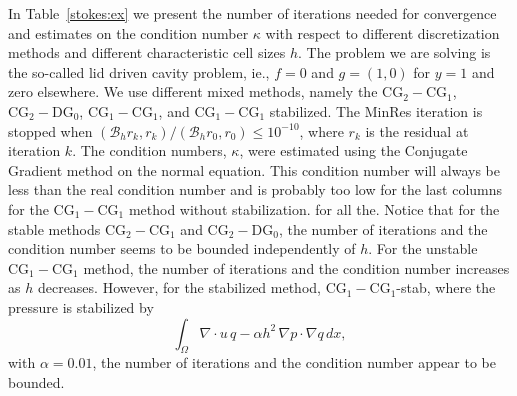 In Table~\ref{stokes:ex} 
we present the number of iterations needed for convergence 
and estimates on the condition number $\kappa$ with 
respect to different discretization methods and different characteristic cell sizes $h$. The problem we
are solving is the so-called lid driven cavity problem, ie., $f=0$ and $g = (1,0)$ for $y=1$ and zero elsewhere.   
We use different mixed methods, namely  the  $\mathrm{CG}_2-\mathrm{CG}_1$, $\mathrm{CG}_2-\mathrm{DG}_0$,  
$\mathrm{CG}_1-\mathrm{CG}_1$, and  $\mathrm{CG}_1-\mathrm{CG}_1$ stabilized.  
The MinRes iteration is stopped when 
$(\mathcal{B}_h r_k, r_k)/(\mathcal{B}_h r_0, r_0) \le 10^{-10}$, where $r_k$ is the residual at
iteration $k$. 
The condition numbers, $\kappa$, were estimated using the Conjugate Gradient method on the
normal equation. This condition number will always be less 
than the real condition number and is probably too low
for the last columns for the $\mathrm{CG}_1-\mathrm{CG}_1$ method without stabilization. 
for all the. 
Notice that for the stable methods $\mathrm{CG}_2-\mathrm{CG}_1$ and $\mathrm{CG}_2-\mathrm{DG}_0$,
the number of iterations and the condition number seems to be bounded
independently of $h$. For the unstable $\mathrm{CG}_1-\mathrm{CG}_1$ method, the number of iterations
and the condition number increases as $h$ decreases. However, for 
the stabilized method, $\mathrm{CG}_1-\mathrm{CG}_1$-stab, where the pressure is stabilized by 
\[
\int_\Omega \nabla \cdot u \, q  - \alpha h^2 \, \nabla p \cdot \nabla q \, dx,       
\]
with $\alpha=0.01$, the number of iterations and the condition number appear to be bounded. 

